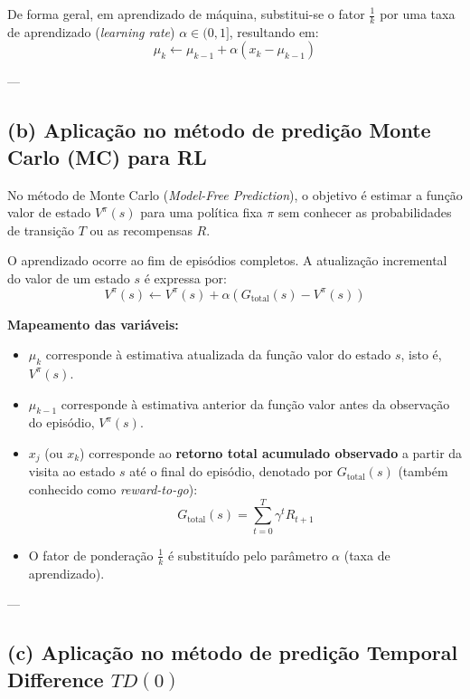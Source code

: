 \documentclass[a4paper,12pt]{article}
\begin{document}
De forma geral, em aprendizado de máquina, substitui-se o fator $\frac{1}{k}$ por uma taxa de aprendizado (\textit{learning rate}) $\alpha \in (0, 1]$, resultando em:
\begin{equation}
	\mu_k \leftarrow \mu_{k-1} + \alpha (x_k - \mu_{k-1})
\end{equation}

---

\subsection*{(b) Aplicação no método de predição Monte Carlo (MC) para RL}

No método de Monte Carlo (\textit{Model-Free Prediction}), o objetivo é estimar a função valor de estado $V^\pi(s)$ para uma política fixa $\pi$ sem conhecer as probabilidades de transição $T$ ou as recompensas $R$.

O aprendizado ocorre ao fim de episódios completos. A atualização incremental do valor de um estado $s$ é expressa por:
\begin{equation}
	V^\pi(s) \leftarrow V^\pi(s) + \alpha \left( G_{\text{total}}(s) - V^\pi(s) \right)
\end{equation}

\textbf{Mapeamento das variáveis:}
\begin{itemize}
	\item $\mu_k$ corresponde à estimativa atualizada da função valor do estado $s$, isto é, $V^\pi(s)$.
	\item $\mu_{k-1}$ corresponde à estimativa anterior da função valor antes da observação do episódio, $V^\pi(s)$.
	\item $x_j$ (ou $x_k$) corresponde ao \textbf{retorno total acumulado observado} a partir da visita ao estado $s$ até o final do episódio, denotado por $G_{\text{total}}(s)$ (também conhecido como \textit{reward-to-go}):
	\begin{equation}
		G_{\text{total}}(s) = \sum_{t=0}^{T} \gamma^t R_{t+1}
	\end{equation}
	\item O fator de ponderação $\frac{1}{k}$ é substituído pelo parâmetro $\alpha$ (taxa de aprendizado).
\end{itemize}

---

\subsection*{(c) Aplicação no método de predição Temporal Difference $TD(0)$}
\end{document}
